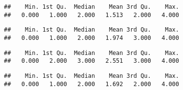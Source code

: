 \documentclass[]{article}
\newenvironment{Shaded}{\begin{snugshade}}{\end{snugshade}}
\newcommand{\KeywordTok}[1]{\textcolor[rgb]{0.13,0.29,0.53}{\textbf{#1}}}
\newcommand{\DecValTok}[1]{\textcolor[rgb]{0.00,0.00,0.81}{#1}}
\newcommand{\OperatorTok}[1]{\textcolor[rgb]{0.81,0.36,0.00}{\textbf{#1}}}
\newcommand{\NormalTok}[1]{#1}
\begin{document}
\begin{Shaded}
\end{Shaded}

\begin{verbatim}
##    Min. 1st Qu.  Median    Mean 3rd Qu.    Max. 
##   0.000   1.000   2.000   1.513   2.000   4.000
\end{verbatim}

\begin{Shaded}
\end{Shaded}

\begin{verbatim}
##    Min. 1st Qu.  Median    Mean 3rd Qu.    Max. 
##   0.000   1.000   2.000   1.974   3.000   4.000
\end{verbatim}

\begin{Shaded}
\end{Shaded}

\begin{verbatim}
##    Min. 1st Qu.  Median    Mean 3rd Qu.    Max. 
##   0.000   2.000   3.000   2.551   3.000   4.000
\end{verbatim}

\begin{Shaded}
\end{Shaded}

\begin{verbatim}
##    Min. 1st Qu.  Median    Mean 3rd Qu.    Max. 
##   0.000   1.000   2.000   1.692   2.000   4.000
\end{verbatim}

\begin{Shaded}
\end{Shaded}
\end{document}
